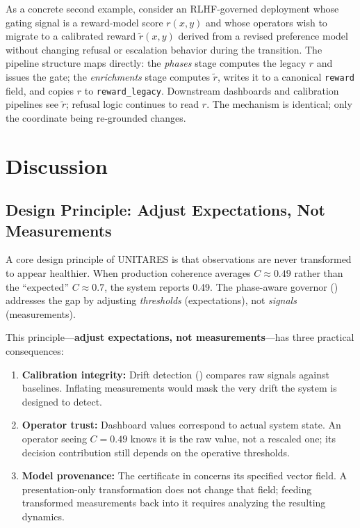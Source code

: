 \documentclass[11pt,twocolumn]{article}
\begin{document}
As a concrete second example, consider an RLHF-governed deployment
whose gating signal is a reward-model score $r(x, y)$ and whose
operators wish to migrate to a calibrated reward $\tilde{r}(x, y)$
derived from a revised preference model without changing refusal or
escalation behavior during the transition. The pipeline structure
maps directly: the \emph{phases} stage computes the legacy $r$ and
issues the gate; the \emph{enrichments} stage computes $\tilde{r}$,
writes it to a canonical \texttt{reward} field, and copies $r$ to
\texttt{reward\_legacy}. Downstream dashboards and calibration
pipelines see $\tilde{r}$; refusal logic continues to read $r$.
The mechanism is identical; only the coordinate being re-grounded
changes.


\section{Discussion}
\label{sec:discussion}

\subsection{Design Principle: Adjust Expectations, Not Measurements}
\label{sec:honest}

A core design principle of UNITARES is that observations are never
transformed to appear healthier. When production coherence averages
$C \approx 0.49$ rather than the ``expected'' $C \approx 0.7$, the
system reports 0.49. The phase-aware governor ()
addresses the gap by adjusting \emph{thresholds} (expectations), not
\emph{signals} (measurements).

This principle---\textbf{adjust expectations, not measurements}---has
three practical consequences:
\begin{enumerate}
\item \textbf{Calibration integrity:} Drift detection
  () compares raw signals against baselines.
  Inflating measurements would mask the very drift the system is
  designed to detect.
\item \textbf{Operator trust:} Dashboard values correspond to actual
  system state. An operator seeing $C = 0.49$ knows it is the raw
  value, not a rescaled one; its decision contribution still depends
  on the operative thresholds.
\item \textbf{Model provenance:} The certificate in
   concerns its specified vector field. A
  presentation-only transformation does not change that field;
  feeding transformed measurements back into it requires analyzing
  the resulting dynamics.
\end{enumerate}
\end{document}
